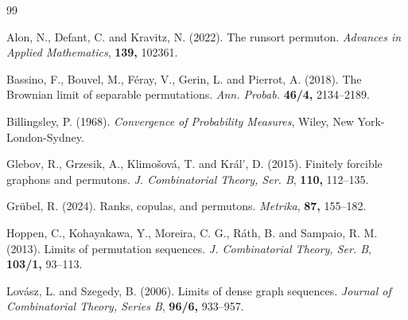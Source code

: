 \documentclass[12pt,twoside]{article}
\theoremstyle{definition}
\theoremstyle{remark}
\numberwithin{equation}{section}
\theoremstyle{plain}
\theoremstyle{remark}
\begin{document}
\begin{thebibliography}{99}
\footnotesize

{\sc Alon, N., Defant, C. and Kravitz, N.} (2022).
The runsort permuton.
{\em Advances in Applied Mathematics}, {\bf 139,} 102361. 
%

%
{\sc Bassino, F., Bouvel, M., Féray, V., Gerin, L. and Pierrot, A.} (2018).
The Brownian limit of separable permutations.
{\em Ann. Probab.}
{\bf 46/4,} 2134--2189.
%

{\sc Billingsley, P.} (1968).
{\em Convergence of Probability Measures}, 
Wiley, New York-London-Sydney.
%

{\sc Glebov, R., Grzesik, A., Klimo\v sov\'a, T. and  Kr\'al', D.} (2015).
Finitely forcible graphons and permutons.
{\em J. Combinatorial Theory, Ser. B},
{\bf 110,} 112--135.
%

{\sc Gr\"ubel, R.} (2024).
Ranks, copulas, and permutons. 
{\em Metrika}, {\bf 87,} 155--182. 
%

{\sc Hoppen, C.,  Kohayakawa, Y.,  Moreira, C. G.,  R\'ath, B. and Sampaio, R. M.} (2013).
Limits of permutation sequences.
{\em J. Combinatorial Theory, Ser. B},
{\bf 103/1,} 93--113.
%

{\sc Lov\'asz, L. and Szegedy, B.} (2006).
Limits of dense graph sequences.
{\em Journal of Combinatorial Theory, Series B},
{\bf 96/6,} 933--957.

\end{thebibliography}
\end{document}
